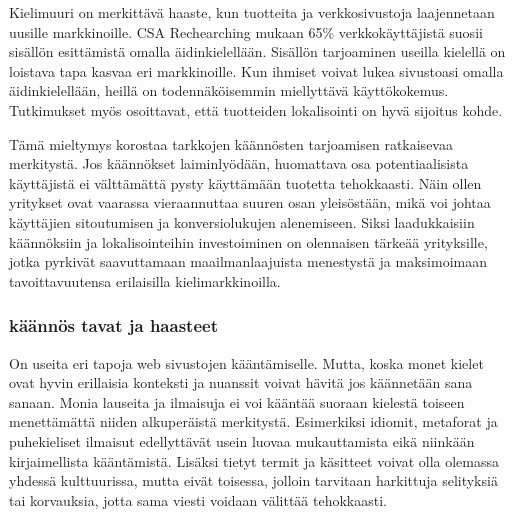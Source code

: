 \documentclass[11pt,a4paper,titlepage,oneside]{article}
\begin{document}






Kielimuuri on merkittävä haaste, kun tuotteita ja verkkosivustoja laajennetaan uusille markkinoille.
CSA Rechearching mukaan 65\% verkkokäyttäjistä suosii sisällön esittämistä omalla äidinkielellään.
Sisällön tarjoaminen useilla kielellä on loistava tapa kasvaa eri markkinoille. 
Kun ihmiset voivat lukea sivustoasi omalla äidinkielellään, heillä on todennäköisemmin miellyttävä käyttökokemus. 
Tutkimukset myös osoittavat, että tuotteiden lokalisointi on hyvä sijoitus kohde.
\medskip

Tämä mieltymys korostaa tarkkojen käännösten tarjoamisen ratkaisevaa merkitystä.
Jos käännökset laiminlyödään, huomattava osa potentiaalisista käyttäjistä ei välttämättä pysty käyttämään tuotetta tehokkaasti.
Näin ollen yritykset ovat vaarassa vieraannuttaa suuren osan yleisöstään, 
mikä voi johtaa käyttäjien sitoutumisen ja konversiolukujen alenemiseen.
Siksi laadukkaisiin käännöksiin ja lokalisointeihin investoiminen on olennaisen tärkeää yrityksille,
jotka pyrkivät saavuttamaan maailmanlaajuista menestystä ja maksimoimaan tavoittavuutensa erilaisilla kielimarkkinoilla.
\medskip









\subsubsection{käännös tavat ja haasteet}



On useita eri tapoja web sivustojen kääntämiselle.
Mutta, koska monet kielet ovat hyvin erillaisia konteksti ja nuanssit voivat hävitä jos käännetään sana sanaan.
Monia lauseita ja ilmaisuja ei voi kääntää suoraan kielestä toiseen menettämättä niiden alkuperäistä merkitystä.
Esimerkiksi idiomit, metaforat ja puhekieliset ilmaisut edellyttävät usein luovaa mukauttamista eikä niinkään kirjaimellista kääntämistä. 
Lisäksi tietyt termit ja käsitteet voivat olla olemassa yhdessä kulttuurissa, 
mutta eivät toisessa, jolloin tarvitaan harkittuja selityksiä tai korvauksia, jotta sama viesti voidaan välittää tehokkaasti.\citemissing
\medskip
\end{document}
